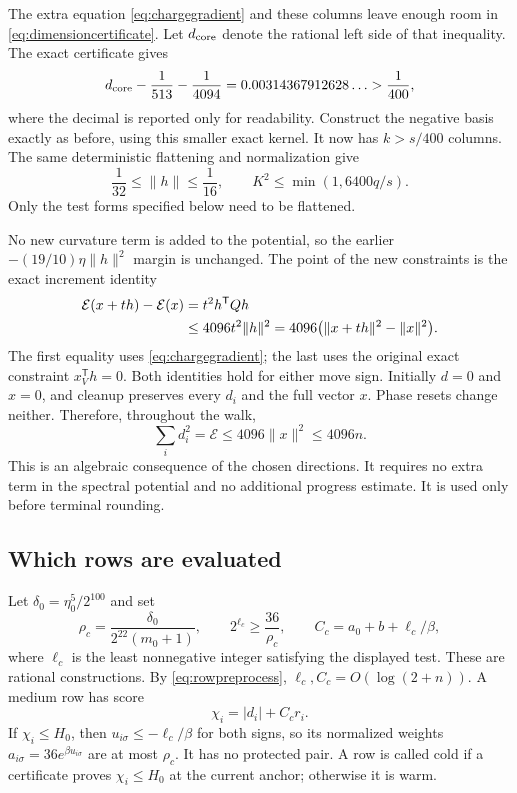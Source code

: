 \documentclass[11pt]{amsart}
\theoremstyle{remark}\newtheorem{remark}[theorem]{Remark}
\newcommand{\T}{\mathsf T}
\begin{document}
The extra equation \eqref{eq:chargegradient} and these columns leave enough
room in \eqref{eq:dimensioncertificate}. Let $d_{\rm core}$ denote the
rational left side of that inequality. The exact certificate gives
\begin{equation}\label{eq:chargeddimension}
 d_{\rm core}-\frac1{513}-\frac1{4094}
 =0.00314367912628\ldots>\frac1{400},
\end{equation}
where the decimal is reported only for readability.
Construct the negative basis exactly as before, using this smaller exact
kernel. It now has $k>s/400$ columns. The same deterministic flattening
and normalization give
\begin{equation}\label{eq:screenedflat}
 \frac1{32}\le\|h\|\le\frac1{16},\qquad
 K^2\le\min(1,6400q/s).
\end{equation}
Only the test forms specified below need to be flattened.

No new curvature term is added to the potential, so the earlier
$-(19/10)\eta\|h\|^2$ margin is unchanged. The point of the new
constraints is the exact increment identity
\begin{align}\label{eq:rowenergyincrement}
 \mathcal E(x+th)-\mathcal E(x)
 &=t^2h^\T Qh\notag\\
 &\le4096t^2\|h\|^2
 =4096\bigl(\|x+th\|^2-\|x\|^2\bigr).
\end{align}
The first equality uses \eqref{eq:chargegradient}; the last uses the
original exact constraint $x_V^\T h=0$.
Both identities hold for either move sign. Initially $d=0$ and $x=0$,
and cleanup preserves every $d_i$ and the full vector $x$. Phase resets
change neither. Therefore, throughout the walk,
\begin{equation}\label{eq:rowenergybound}
 \sum_i d_i^2=\mathcal E\le4096\|x\|^2\le4096n.
\end{equation}
This is an algebraic consequence of the chosen directions. It requires
no extra term in the spectral potential and no additional progress
estimate. It is used only before terminal rounding.

\subsection{Which rows are evaluated}
Let $\delta_0=\eta_0^5/2^{100}$ and set
\begin{equation}\label{eq:screeningprecision}
 \rho_c=\frac{\delta_0}{2^{22}(m_0+1)},\qquad
 2^{\ell_c}\ge\frac{36}{\rho_c},\qquad
 C_c=a_0+b+\ell_c/\beta,
\end{equation}
where $\ell_c$ is the least nonnegative integer satisfying the displayed
test. These are rational constructions. By \eqref{eq:rowpreprocess},
$\ell_c,C_c=O(\log(2+n))$.
A medium row has score
\[
 \chi_i=|d_i|+C_c r_i.
\]
If $\chi_i\le H_0$, then
$u_{i\sigma}\le-\ell_c/\beta$ for both signs, so its normalized weights
$a_{i\sigma}=36e^{\beta u_{i\sigma}}$ are at most $\rho_c$.
It has no protected pair. A row is called cold if a certificate proves
$\chi_i\le H_0$ at the current anchor; otherwise it is warm.
\end{document}
